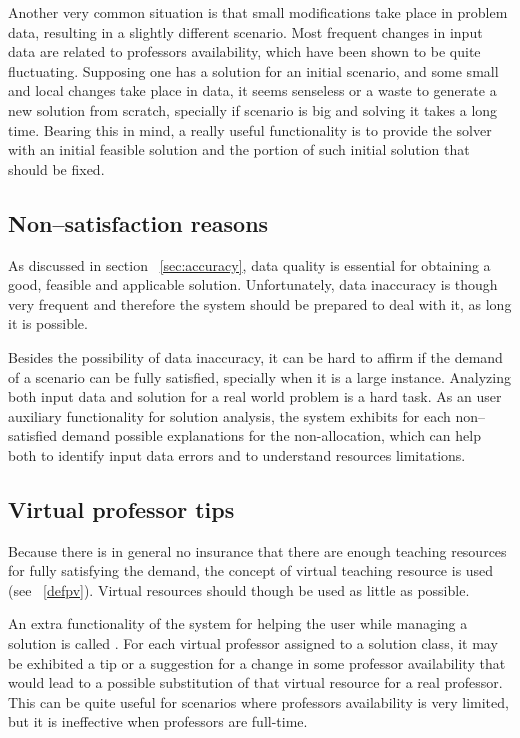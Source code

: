 Another very common situation is that small modifications take place in problem data, resulting in a slightly different scenario. Most frequent changes in input data are related to professors availability, which have been shown to be quite fluctuating. Supposing one has a solution for an initial scenario, and some small and local changes take place in data, it seems senseless or a waste to generate a new solution from scratch, specially if scenario is big and solving it takes a long time. Bearing this in mind, a really useful functionality is to provide the solver with an initial feasible solution and the portion of such initial solution that should be fixed.


\subsection{Non--satisfaction reasons}
\label{subsec:reasons}

As discussed in section ~\ref{sec:accuracy}, data quality is essential for obtaining a good, feasible and applicable solution. Unfortunately, data inaccuracy is though very frequent and therefore the system should be prepared to deal with it, as long it is possible.

Besides the possibility of data inaccuracy, it can be hard to affirm if the demand of a scenario can be fully satisfied, specially when it is a large instance. Analyzing both input data and solution for a real world problem is a hard task. As an user auxiliary functionality for solution analysis, the system exhibits for each non--satisfied demand possible explanations for the non-allocation, which can help both to identify input data errors and to understand resources limitations.


\subsection{Virtual professor tips}
\label{subsec:tips}

Because there is in general no insurance that there are enough teaching resources for fully satisfying the demand, the concept of virtual teaching resource is used (see ~\ref{defpv}). Virtual resources should though be used as little as possible.

An extra functionality of the system for helping the user while managing a solution is called . For each virtual professor assigned to a solution class, it may be exhibited a tip or a suggestion for a change in some professor availability that would lead to a possible substitution of that virtual resource for a real professor. This can be quite useful for scenarios where professors availability is very limited, but it is ineffective when professors are full-time.



